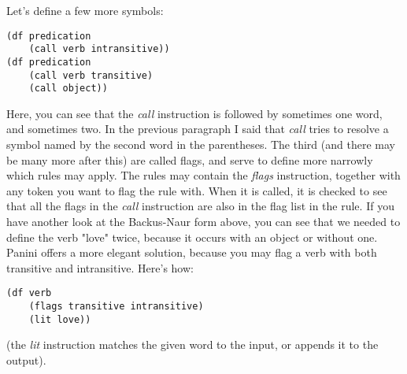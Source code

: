 \documentclass{article}
\begin{document}
Let's define a few more symbols:
\begin{lstlisting}
(df predication
	(call verb intransitive))
(df predication
	(call verb transitive)
	(call object))
\end{lstlisting}
Here, you can see that the \emph{call} instruction is followed by sometimes one word, and sometimes two. In the previous paragraph I
said that \emph{call} tries to resolve a symbol named by the second word in the parentheses. The third (and there may be many more
after this) are called flags, and serve to define more narrowly which rules may apply. The rules may contain the \emph{flags} 
instruction, together with any token you want to flag the rule with. When it is called, it is checked to see that all the flags in 
the \emph{call} instruction are also in the flag list in the rule. If you have another look at the Backus-Naur form above, you can 
see that we needed to define the verb "love" twice, because it occurs with an object or without one. 
Panini offers a more elegant solution, because you may flag a verb with both transitive and intransitive. Here's how:
\begin{lstlisting}
(df verb
	(flags transitive intransitive)
	(lit love))
\end{lstlisting}
(the \emph{lit} instruction matches the given word to the input, or appends it to the output).

\label{end}
\end{document}
